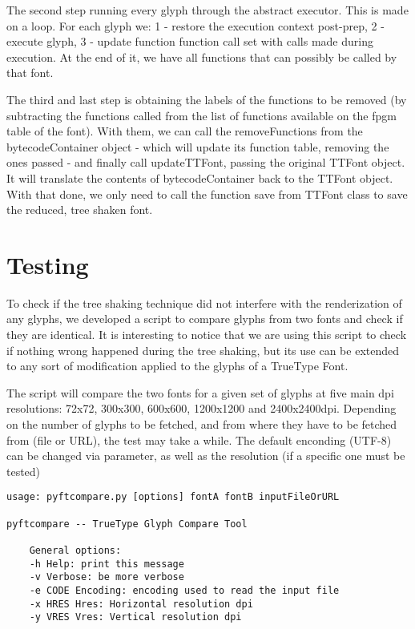 \documentclass[12pt]{article}
\begin{document}
The second step running every glyph through the abstract executor.
This is made on a loop. For each glyph we: 1 - restore the execution
context post-prep, 2 - execute glyph, 3 - update function function call
set with calls made during execution. At the end of it, we have all
functions that can possibly be called by that font.

The third and last step is obtaining the labels of the functions
to be removed (by subtracting the functions called from the list of
functions available on the fpgm table of the font). With them, we can
call the removeFunctions from the bytecodeContainer object - which will
update its function table, removing the ones passed - and finally call
updateTTFont, passing the original TTFont object. It will translate the
contents of bytecodeContainer back to the TTFont object. With that done,
we only need to call the function save from TTFont class to save the
reduced, tree shaken font.

\section{Testing}

To check if the tree shaking technique did not interfere with the
renderization of any glyphs, we developed a script to compare glyphs
from two fonts and check if they are identical. It is interesting to
notice that we are using this script to check if nothing wrong happened
during the tree shaking, but its use can be extended to any sort of
modification applied to the glyphs of a TrueType Font.

The script will compare the two fonts for a given set of glyphs at
five main dpi resolutions: 72x72, 300x300, 600x600, 1200x1200 and
2400x2400dpi. Depending on the number of glyphs to be fetched, and from
where they have to be fetched from (file or URL), the test may take a
while. The default enconding (UTF-8) can be changed via parameter, as
well as the resolution (if a specific one must be tested)

\begin{lstlisting}
usage: pyftcompare.py [options] fontA fontB inputFileOrURL

pyftcompare -- TrueType Glyph Compare Tool

    General options:
    -h Help: print this message
    -v Verbose: be more verbose
    -e CODE Encoding: encoding used to read the input file
    -x HRES Hres: Horizontal resolution dpi
    -y VRES Vres: Vertical resolution dpi
\end{lstlisting}
\end{document}

